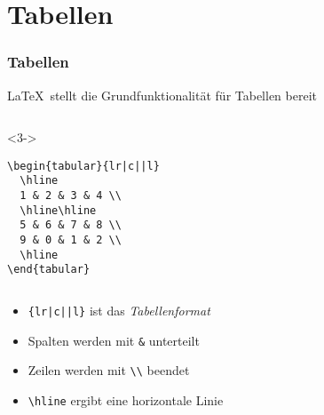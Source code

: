 \section{Tabellen}

\begin{frame}[fragile]
  \frametitle{Tabellen}


  \LaTeX\ stellt die Grundfunktionalität für Tabellen bereit

  \begin{columns}
    \begin{column}{0.4\linewidth}
      \begin{block}<3->{}
\begin{lstlisting}
\begin{tabular}{lr|c||l}
  \hline
  1 & 2 & 3 & 4 \\
  \hline\hline
  5 & 6 & 7 & 8 \\
  9 & 0 & 1 & 2 \\
  \hline
\end{tabular}
\end{lstlisting}
      \end{block}
    \end{column}
    \begin{column}{0.5\linewidth}
      \centering
    \end{column}
  \end{columns}

  \begin{itemize}
  \item<4-> \lstinline!{lr|c||l}! ist das \emph{Tabellenformat}
  \item<5-> Spalten werden mit \lstinline|&| unterteilt
  \item<6-> Zeilen werden mit \lstinline|\\| beendet
  \item<7-> \lstinline|\hline| ergibt eine horizontale Linie
  \end{itemize}

\end{frame}

